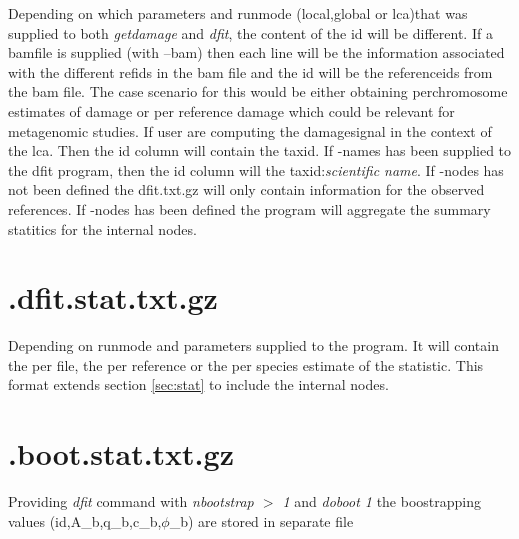 \documentclass[10pt]{article}
\begin{document}
Depending on which parameters and runmode (local,global or lca)that was supplied to both
\emph{getdamage} and \emph{dfit}, the content of the id will be
different. If a bamfile is supplied (with --bam) then each line will be
the information associated with the different refids in the bam file
and the id will be the referenceids from the bam file. The case
scenario for this would be either obtaining perchromosome estimates of
damage or per reference damage which could be relevant for metagenomic
studies. If user are computing the damagesignal in the context of the
lca. Then the id column will contain the taxid. If -names has been
supplied to the dfit program, then the id column will the
taxid:\emph{scientific name}. If -nodes has not been defined the
dfit.txt.gz will only contain information for the observed
references. If -nodes has been defined the program will aggregate the
summary statitics for the internal nodes.
\section{.dfit.stat.txt.gz}
Depending on runmode and parameters supplied to the program. It will contain the
per file, the per reference or the per species estimate of the
statistic. This format extends section \ref{sec:stat} to include the internal
nodes.

\section{.boot.stat.txt.gz}
Providing \textit{dfit} command with \textit{nbootstrap $>$ 1} and \textit{doboot 1} the boostrapping values (id,A\_b,q\_b,c\_b,$\phi$\_b) are stored in separate file
\end{document}
